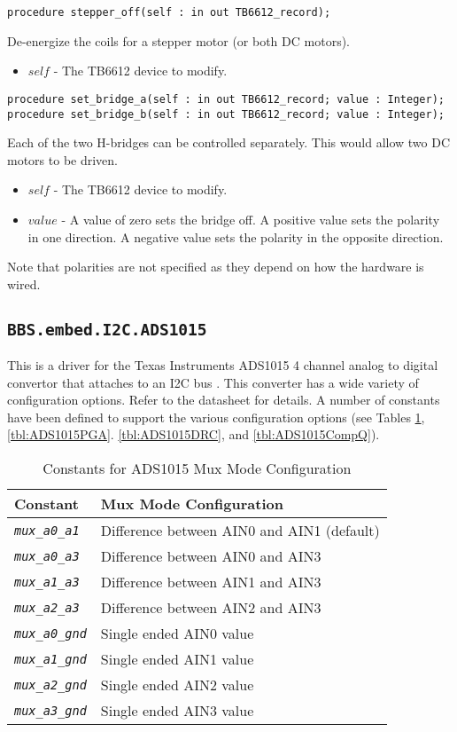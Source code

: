 \documentclass[10pt, openany]{book}
\newcommand{\package}[1]{\texttt{#1}}
\newcommand{\constant}[1]{\emph{\texttt{#1}}}
\begin{document}
\begin{lstlisting}
procedure stepper_off(self : in out TB6612_record);
\end{lstlisting}
De-energize the coils for a stepper motor (or both DC motors).
\begin{itemize}
  \item $self$ - The TB6612 device to modify.
\end{itemize}
\begin{lstlisting}
procedure set_bridge_a(self : in out TB6612_record; value : Integer);
procedure set_bridge_b(self : in out TB6612_record; value : Integer);
\end{lstlisting}
Each of the two H-bridges can be controlled separately.  This would allow two DC motors to be driven.
\begin{itemize}
  \item $self$ - The TB6612 device to modify.
  \item $value$ - A value of zero sets the bridge off.  A positive value sets the polarity in one direction.  A negative value sets the polarity in the opposite direction.
\end{itemize}

Note that polarities are not specified as they depend on how the hardware is wired.

\subsection{\package{BBS.embed.I2C.ADS1015}}
This is a driver for the Texas Instruments ADS1015 4 channel analog to digital convertor that attaches to an I2C bus \cite{ADS1015}.  This converter has a wide variety of configuration options.  Refer to the datasheet for details.  A number of constants have been defined to support the various configuration options (see Tables \ref{tbl:ADS1015mux}, \ref{tbl:ADS1015PGA}. \ref{tbl:ADS1015DRC}, and \ref{tbl:ADS1015CompQ}).

\begin{table}[!h]
\begin{center}
  \begin{tabular}{l|l}
    Constant & Mux Mode Configuration \\
    \hline
    \constant{mux\_a0\_a1} & Difference between AIN0 and AIN1 (default) \\
    \constant{mux\_a0\_a3} & Difference between AIN0 and AIN3 \\
    \constant{mux\_a1\_a3} & Difference between AIN1 and AIN3 \\
    \constant{mux\_a2\_a3} & Difference between AIN2 and AIN3 \\
    \constant{mux\_a0\_gnd} & Single ended AIN0 value \\
    \constant{mux\_a1\_gnd} & Single ended AIN1 value \\
    \constant{mux\_a2\_gnd} & Single ended AIN2 value \\
    \constant{mux\_a3\_gnd} & Single ended AIN3 value \\
  \end{tabular}
  \caption{Constants for ADS1015 Mux Mode Configuration}
  \label{tbl:ADS1015mux}
\end{center}
\end{table}
\end{document}
